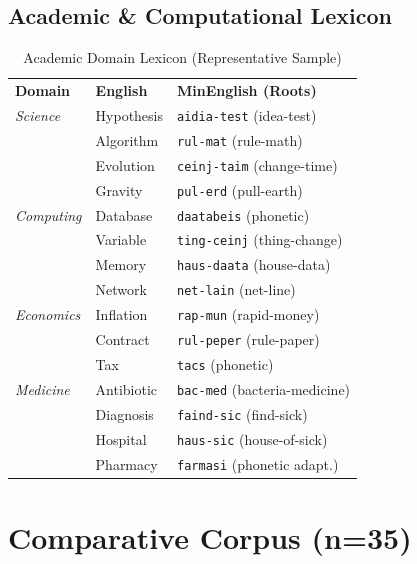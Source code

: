 \documentclass[12pt,onecolumn,letterpaper]{article}
\newcommand{\me}[1]{\texttt{#1}}
\newcommand{\MEtablelayout}{%
\footnotesize
\setlength{\tabcolsep}{6pt}%
\renewcommand{\arraystretch}{1.12}%
\arrayrulecolor{MERule}%
}
\begin{document}
\subsection{Academic \& Computational Lexicon}

\begin{table}[h!]
\centering
\MEtablelayout
\begin{tabularx}{\linewidth}{llX}
\rowcolor{MEGray}
\textbf{Domain} & \textbf{English} & \textbf{MinEnglish (Roots)} \\
\textit{Science}    & Hypothesis  & \me{aidia-test} (idea-test) \\
                    & Algorithm   & \me{rul-mat} (rule-math) \\
                    & Evolution   & \me{ceinj-taim} (change-time) \\
                    & Gravity     & \me{pul-erd} (pull-earth) \\
\midrule
\textit{Computing}  & Database    & \me{daatabeis} (phonetic) \\
                    & Variable    & \me{ting-ceinj} (thing-change) \\
                    & Memory      & \me{haus-daata} (house-data) \\
                    & Network     & \me{net-lain} (net-line) \\
\midrule
\textit{Economics}  & Inflation   & \me{rap-mun} (rapid-money) \\
                    & Contract    & \me{rul-peper} (rule-paper) \\
                    & Tax         & \me{tacs} (phonetic) \\
\midrule
\textit{Medicine}   & Antibiotic  & \me{bac-med} (bacteria-medicine) \\
                    & Diagnosis   & \me{faind-sic} (find-sick) \\
                    & Hospital    & \me{haus-sic} (house-of-sick) \\
                    & Pharmacy    & \me{farmasi} (phonetic adapt.) \\
\bottomrule
\end{tabularx}
\caption{Academic Domain Lexicon (Representative Sample)}
\end{table}

\section{Comparative Corpus (n=35)}
\end{document}
